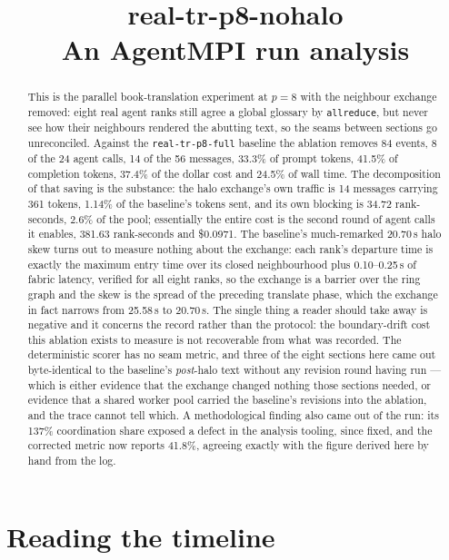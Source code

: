 \documentclass[11pt]{article}
\title{\textbf{real-tr-p8-nohalo}\\[2pt]\large An AgentMPI run analysis}
\author{}
\date{}
\begin{document}
\maketitle

\begin{abstract}
This is the parallel book-translation experiment at $p=8$ with the neighbour exchange removed:
eight real agent ranks still agree a global glossary by \texttt{allreduce}, but never see how their
neighbours rendered the abutting text, so the seams between sections go unreconciled. Against the
\texttt{real-tr-p8-full} baseline the ablation removes 84 events, 8 of the 24 agent calls, 14 of the
56 messages, 33.3\% of prompt tokens, 41.5\% of completion tokens, 37.4\% of the dollar cost and
24.5\% of wall time. The decomposition of that saving is the substance: the halo exchange's own
traffic is 14 messages carrying 361 tokens, 1.14\% of the baseline's tokens sent, and its own
blocking is 34.72 rank-seconds, 2.6\% of the pool; essentially the entire cost is the second round of
agent calls it enables, 381.63 rank-seconds and \$0.0971. The baseline's much-remarked 20.70\,s halo
skew turns out to measure nothing about the exchange: each rank's departure time is exactly the
maximum entry time over its closed neighbourhood plus 0.10--0.25\,s of fabric latency, verified for
all eight ranks, so the exchange is a barrier over the ring graph and the skew is the spread of the
preceding translate phase, which the exchange in fact narrows from 25.58\,s to 20.70\,s. The single
thing a reader should take away is negative and it concerns the record rather than the protocol:
the boundary-drift cost this ablation exists to measure is not recoverable from what was recorded.
The deterministic scorer has no seam metric, and three of the eight sections here came out
byte-identical to the baseline's \emph{post}-halo text without any revision round having run --- which
is either evidence that the exchange changed nothing those sections needed, or evidence that a
shared worker pool carried the baseline's revisions into the ablation, and the trace cannot tell
which. A methodological finding also came out of the run: its 137\% coordination share exposed a
defect in the analysis tooling, since fixed, and the corrected metric now reports 41.8\%, agreeing
exactly with the figure derived here by hand from the log.
\end{abstract}



\section{Reading the timeline}
\end{document}
